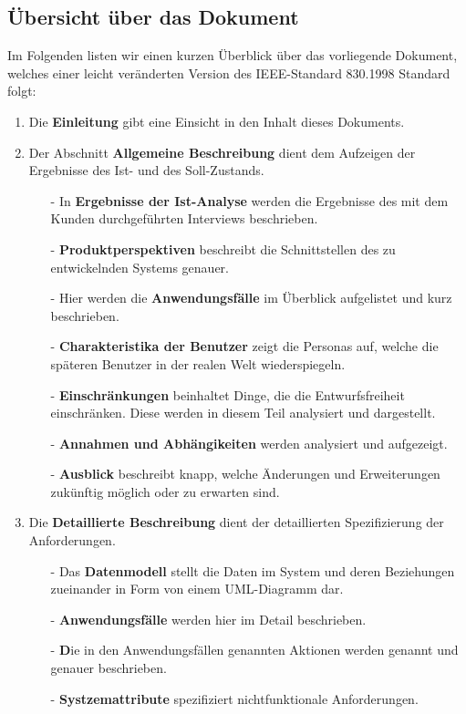 \documentclass[fontsize=12pt,paper=a4,twoside]{scrartcl}
\begin{document}
\subsection{Übersicht über das Dokument} \label{subsec:Uebersicht} Im Folgenden listen wir einen kurzen Überblick über das vorliegende Dokument, welches einer leicht veränderten Version des IEEE-Standard 830.1998 Standard folgt: 
\begin{enumerate}
	\item Die \textbf{Einleitung} gibt eine Einsicht in den Inhalt dieses Dokuments. 
	\item Der Abschnitt \textbf{Allgemeine Beschreibung} dient dem Aufzeigen der Ergebnisse des Ist- und des Soll-Zustands. 
	\begin{itemize}
		\item[-]In \textbf{Ergebnisse der Ist-Analyse} werden die Ergebnisse des mit dem Kunden durchgeführten Interviews beschrieben. 
		\item[-] \textbf{Produktperspektiven} beschreibt die Schnittstellen des zu entwickelnden Systems genauer. 
		\item[-] Hier werden die \textbf{Anwendungsfälle} im Überblick aufgelistet und kurz beschrieben. 
		\item[-] \textbf{Charakteristika der Benutzer} zeigt die Personas auf, welche die späteren Benutzer in der realen Welt wiederspiegeln. 
		\item[-] \textbf{Einschränkungen} beinhaltet Dinge, die die Entwurfsfreiheit einschränken. Diese werden in diesem Teil analysiert und dargestellt. 
		\item[-] \textbf{Annahmen und Abhängikeiten} werden analysiert und aufgezeigt. 
		\item[-] \textbf{Ausblick} beschreibt knapp, welche Änderungen und Erweiterungen zukünftig möglich oder zu erwarten sind. 
	\end{itemize}
	\item Die \textbf{Detaillierte Beschreibung} dient der detaillierten Spezifizierung der Anforderungen. 
	\begin{itemize}
		\item[-] Das \textbf{Datenmodell} stellt die Daten im System und deren Beziehungen zueinander in Form von einem UML-Diagramm dar. 
		\item[-] \textbf{Anwendungsfälle} werden hier im Detail beschrieben. 
		\item[-] \textbf Die in den Anwendungsfällen genannten {Aktionen} werden genannt und genauer beschrieben. 
		\item[-] \textbf{Systzemattribute} spezifiziert nichtfunktionale Anforderungen. 
	\end{itemize}
\end{enumerate}
\end{document}
